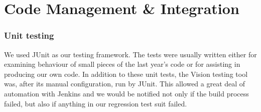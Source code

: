 \section{Code Management \& Integration}

\subsubsection{Unit testing}
We used JUnit as our testing framework. The tests were usually written either for examining behaviour of small pieces of the last year's code or for assisting in producing our own code. In addition to these unit tests, the Vision testing tool was, after its manual configuration, run by JUnit. This allowed a great deal of automation with Jenkins and we would be notified not only if the build process failed, but also if anything in our regression test suit failed.